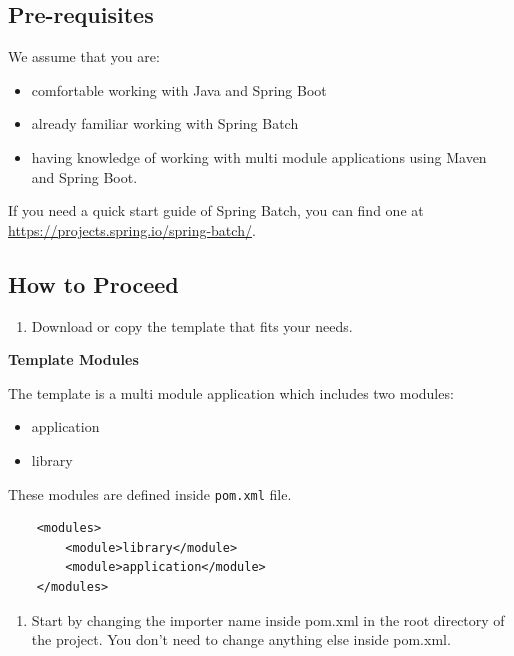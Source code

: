 \subsection{Pre-requisites}

We assume that you are:

\begin{itemize}
\tightlist
\item
  comfortable working with Java and Spring Boot
\item
  already familiar working with Spring Batch
\item
  having knowledge of working with multi module applications using Maven
  and Spring Boot.
\end{itemize}

If you need a quick start guide of Spring Batch, you can find one at
\url{https://projects.spring.io/spring-batch/}.

\subsection{How to Proceed}

\begin{enumerate}
\def\labelenumi{\arabic{enumi}.}
\tightlist
\item
  Download or copy the template that fits your needs.
\end{enumerate}

\textbf{Template Modules}

The template is a multi module application which includes two modules:

\begin{itemize}
\tightlist
\item
  application
\item
  library
\end{itemize}

These modules are defined inside \texttt{pom.xml} file.

\begin{verbatim}
    <modules>
        <module>library</module>
        <module>application</module>
    </modules>
\end{verbatim}

\begin{enumerate}
\def\labelenumi{\arabic{enumi}.}
\setcounter{enumi}{1}
\tightlist
\item
  Start by changing the importer name inside pom.xml in the root
  directory of the project. You don't need to change anything else
  inside pom.xml.
\end{enumerate}


